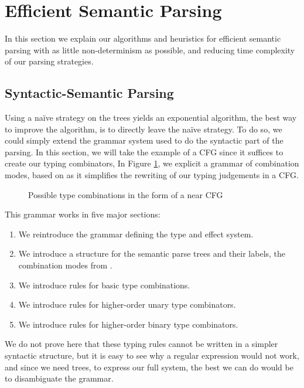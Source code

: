 \section{Efficient Semantic Parsing}
\label{sec:parsing}
In this section we explain our algorithms and heuristics for efficient semantic
parsing with as little non-determinism as possible, and reducing time complexity
of our parsing strategies.

\subsection{Syntactic-Semantic Parsing}
Using a naïve strategy on the trees yields an exponential algorithm,
the best way to improve the algorithm, is to directly leave the naïve strategy.
To do so, we could simply extend the grammar system used to do the syntactic
part of the parsing.
In this section, we will take the example of a CFG since it suffices to create
our typing combinators,
In Figure \ref{fig:combination-cfg}, we explicit a grammar of combination
modes, based on \cite{bumfordEffectdrivenInterpretationFunctors2025} as it
simplifies the rewriting of our typing judgements in a CFG.

\begin{figure}
	\centering
	
	\caption{Possible type combinations in the form of a near CFG}
	\label{fig:combination-cfg}
\end{figure}

This grammar works in five major sections:
\begin{enumerate}
	\item We reintroduce the grammar defining the type and effect system.
	\item We introduce a structure for the semantic parse trees and their labels,
	      the combination modes from
	      \cite{bumfordEffectdrivenInterpretationFunctors2025}.
	\item We introduce rules for basic type combinations.
	\item We introduce rules for higher-order unary type combinators.
	\item We introduce rules for higher-order binary type combinators.
\end{enumerate}

We do not prove here that these typing rules cannot be written in a simpler
syntactic structure, but it is easy to see why a regular expression would not
work, and since we need trees, to express our full system, the best we can do
would be to disambiguate the grammar.

